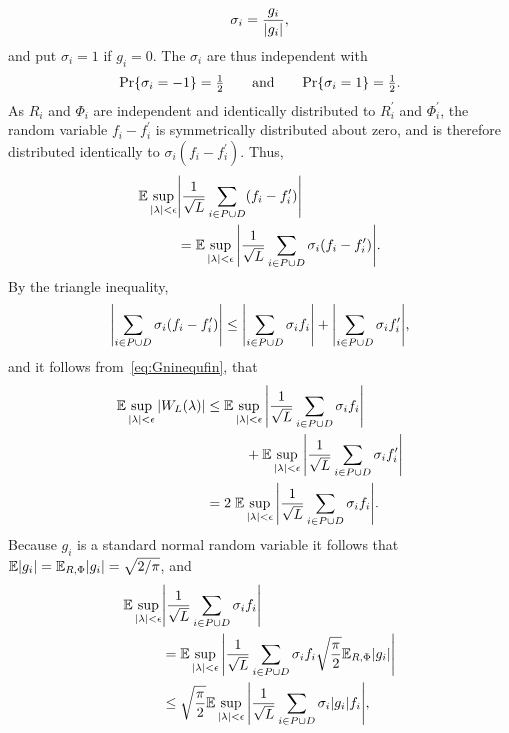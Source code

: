 \documentclass[journal]{IEEEtran}
\begin{document}
\begin{IEEEproof}
\[
\sigma_i = \frac{g_i}{{\left\vert g_i \right\vert}},
\]
and put $\sigma_i = 1$ if $g_i = 0$.  The $\sigma_i$ are thus independent with 
\[
{\operatorname{Pr}}\{ \sigma_i = -1 \} = \tfrac{1}{2} \qquad \text{and} \qquad  {\operatorname{Pr}}\{ \sigma_i = 1 \} = \tfrac{1}{2}.
\]  
As $R_i$ and $\Phi_i$ are independent and identically distributed to $R_i^\prime$ and $\Phi_i^\prime$, the random variable $f_{i} - f_{i}^\prime$ is symmetrically distributed about zero, and is therefore distributed identically to $\sigma_i( f_{i} - f_{i}^\prime)$.  Thus,
\begin{align*}
 {\mathbb E} \sup_{{\vert \lambda \vert} < \epsilon}  &{\left\vert   \frac{1}{\sqrt{L}}\sum_{i \in P \cup D}  (f_{i} - f_{i}^\prime)  \right\vert} \\
&= {\mathbb E} \sup_{{\vert \lambda \vert} < \epsilon}  {\left\vert   \frac{1}{\sqrt{L}}\sum_{i \in P \cup D} \sigma_i ( f_{i} - f_{i}^\prime)  \right\vert}.
\end{align*}
By the triangle inequality,
\[
{\left\vert  \sum_{i\in P \cup D} \sigma_i (f_{i} - f_{i}^\prime) \right\vert} \leq {\left\vert  \sum_{i \in P \cup D} \sigma_i f_{i}  \right\vert} + {\left\vert  \sum_{i\in P \cup D}  \sigma_i f_{i}^\prime  \right\vert},
\]
and it follows from~\eqref{eq:Gninequfin}, that
\begin{align*}
 {\mathbb E} \sup_{{\vert \lambda \vert} < \epsilon} {\left\vert  W_L(\lambda) \right\vert} &\leq {\mathbb E} \sup_{{\vert \lambda \vert} < \epsilon}  {\left\vert  \frac{1}{\sqrt{L}}\sum_{i\in P \cup D} \sigma_i f_{i}  \right\vert} \\
&\hspace{1cm} + {\mathbb E} \sup_{{\vert \lambda \vert} < \epsilon}  {\left\vert \frac{1}{\sqrt{L}} \sum_{i \in P \cup D}  \sigma_i  f_{i}^\prime  \right\vert} \\
&= 2 \; {\mathbb E} \sup_{{\vert \lambda \vert} < \epsilon}  {\left\vert  \frac{1}{\sqrt{L}}\sum_{i \in P \cup D} \sigma_i f_{i}  \right\vert}.
\end{align*}
Because $g_i$ is a standard normal random variable it follows that ${\mathbb E} {\left\vert g_i \right\vert} = {\mathbb E}_{R,\Phi} {\left\vert g_i \right\vert} = \sqrt{2/\pi}$, and
\begin{align*}
\expect \sup_{\sabs{\lambda} < \epsilon}  &\abs{ \frac{1}{\sqrt{L}}\sum_{i \in P \cup D} \sigma_i f_{i} } \\
&= \expect \sup_{\sabs{\lambda} < \epsilon}  \abs{ \frac{1}{\sqrt{L}}\sum_{i \in P \cup D} \sigma_i f_{i} \sqrt{\frac{\pi}{2}}\expect_{R,\Phi} \abs{g_i}} \\
&\leq \sqrt{\frac{\pi}{2}} \expect \sup_{\sabs{\lambda} < \epsilon}  \abs{ \frac{1}{ \sqrt{L}}\sum_{i \in P \cup D} \sigma_i \abs{g_i}  f_{i}},

\end{align*}
\end{IEEEproof}
\end{document}
